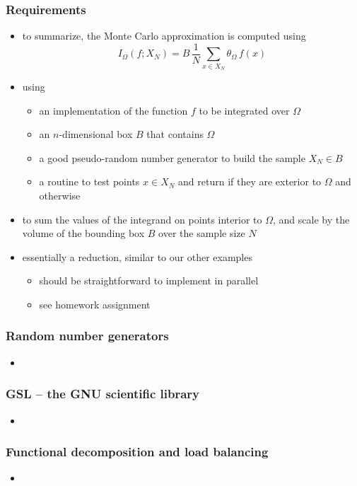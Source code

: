 \begin{frame}[fragile]
%
  \frametitle{Requirements}
%
  \begin{itemize}
%
  \item to summarize, the Monte Carlo approximation is computed using
%
    \begin{equation}
      I_{\Omega} (f; X_{N})
      =
      B \, \frac{1}{N} \sum_{x \in X_{N}} \theta_{\Omega} \, f(x)
    \end{equation}
%
  \item using
    \begin{itemize}
    \item an implementation of the function $f$ to be integrated over $\Omega$
    \item an $n$-dimensional box $B$ that contains $\Omega$
    \item a good pseudo-random number generator to build the sample $X_{N} \in B$
    \item a routine to test points $x \in X_{N}$ and return  if they are
      exterior to $\Omega$ and  otherwise
    \end{itemize}
%
  \item to sum the values of the integrand on points interior to $\Omega$, and scale by the
    volume of the bounding box $B$ over the sample size $N$
%
  \item essentially a reduction, similar to our other examples 
    \begin{itemize}
    \item should be straightforward to implement in parallel
    \item see homework assignment
    \end{itemize}
%
  \end{itemize}
%
\end{frame}

\begin{frame}[fragile]
%
  \frametitle{Random number generators}
%
  \begin{itemize}
%
  \item 
%
  \end{itemize}
%
\end{frame}

\begin{frame}[fragile]
%
  \frametitle{GSL -- the GNU scientific library}
%
  \begin{itemize}
%
  \item 
%
  \end{itemize}
%
\end{frame}

\begin{frame}[fragile]
%
  \frametitle{Functional decomposition and load balancing}
%
  \begin{itemize}
%
  \item 
%
  \end{itemize}
%
\end{frame}


